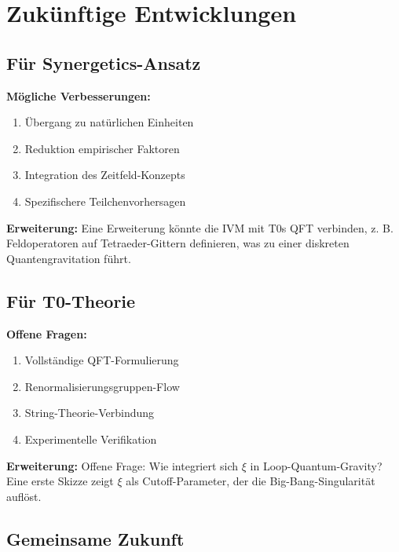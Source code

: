 \documentclass[12pt,a4paper]{article}
\newcommand{\xipar}{\xi}
\begin{document}
	\section{Zukünftige Entwicklungen}
	
	\subsection{Für Synergetics-Ansatz}
	
	\textbf{Mögliche Verbesserungen:}
	\begin{enumerate}
		\item Übergang zu natürlichen Einheiten
		\item Reduktion empirischer Faktoren
		\item Integration des Zeitfeld-Konzepts
		\item Spezifischere Teilchenvorhersagen
	\end{enumerate}
	
	\textbf{Erweiterung:} Eine Erweiterung könnte die IVM mit T0s QFT verbinden, z. B. Feldoperatoren auf Tetraeder-Gittern definieren, was zu einer diskreten Quantengravitation führt.
	
	\subsection{Für T0-Theorie}
	
	\textbf{Offene Fragen:}
	\begin{enumerate}
		\item Vollständige QFT-Formulierung
		\item Renormalisierungsgruppen-Flow
		\item String-Theorie-Verbindung
		\item Experimentelle Verifikation
	\end{enumerate}
	
	\textbf{Erweiterung:} Offene Frage: Wie integriert sich $\xipar$ in Loop-Quantum-Gravity? Eine erste Skizze zeigt $\xipar$ als Cutoff-Parameter, der die Big-Bang-Singularität auflöst.
	
	\subsection{Gemeinsame Zukunft}
	
\end{document}
